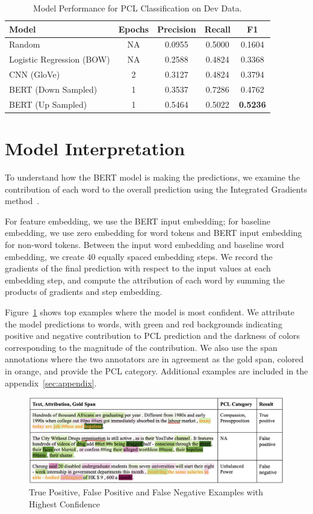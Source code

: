 \documentclass[11pt]{article}
\begin{document}
\begin{table}
\centering
\begin{tabular}{lcccc}
\hline
\textbf{Model} & \textbf{Epochs} & \textbf{Precision} & \textbf{Recall} & \textbf{F1} \\
\hline
Random & NA & 0.0955 & 0.5000 & 0.1604  \\
Logistic Regression (BOW) & NA & 0.2588 & 0.4824 & 0.3368  \\
CNN (GloVe) & 2 & 0.3127 & 0.4824 & 0.3794  \\
BERT (Down Sampled) & 1 & 0.3537 & 0.7286 & 0.4762  \\
BERT (Up Sampled) & 1 & 0.5464 & 0.5022 & \textbf{0.5236}  \\
\hline
\end{tabular}
\caption{Model Performance for PCL Classification on Dev Data.}
\label{tab:perf}
\end{table}

\section{Model Interpretation}

To understand how the BERT model is making the predictions, we examine the contribution of each word to the overall prediction using the Integrated Gradients method~\cite{sundararajan2017axiomatic}. 

For feature embedding, we use the BERT input embedding; for baseline embedding, we use zero embedding for word tokens and BERT input embedding for non-word tokens. Between the input word embedding and baseline word embedding, we create 40 equally spaced embedding steps. We record the gradients of the final prediction with respect to the input values at each embedding step, and compute the attribution of each word by summing the products of gradients and step embedding.

Figure~\ref{fig:fig1} shows top examples where the model is most confident. We attribute the model predictions to words, with green and red backgrounds indicating positive and negative contribution to PCL prediction and the darkness of colors corresponding to the magnitude of the contribution. We also use the span annotations where the two annotators are in agreement as the gold span, colored in orange, and provide the PCL category. Additional examples are included in the appendix~\ref{sec:appendix}.

\begin{figure}
    \centering
    \includegraphics[width=16cm]{Fig 1.png}
    \caption{True Positive, False Positive and False Negative Examples with Highest Confidence}
    \label{fig:fig1}
\end{figure}
\end{document}
